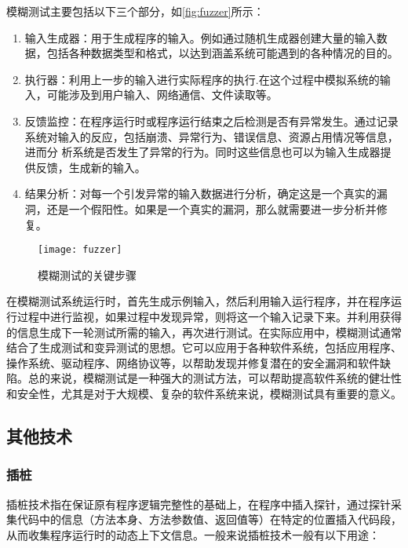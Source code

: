 模糊测试主要包括以下三个部分，如\autoref{fig:fuzzer}所示：

\begin{enumerate}
\item 输入生成器：用于生成程序的输入。例如通过随机生成器创建大量的输入数据，包括各种数据类型和格式，以达到涵盖系统可能遇到的各种情况的目的。
\item 执行器：利用上一步的输入进行实际程序的执行.在这个过程中模拟系统的输入，可能涉及到用户输入、网络通信、文件读取等。
\item 反馈监控：在程序运行时或程序运行结束之后检测是否有异常发生。通过记录系统对输入的反应，包括崩溃、异常行为、错误信息、资源占用情况等信息，进而分 析系统是否发生了异常的行为。同时这些信息也可以为输入生成器提供反馈，生成新的输入。
\item 结果分析：对每一个引发异常的输入数据进行分析，确定这是一个真实的漏洞，还是一个假阳性。如果是一个真实的漏洞，那么就需要进一步分析并修复。
\end{enumerate}

\begin{figure}[ht]
    \centering
    \texttt{[image: fuzzer]}
    \caption{\label{fig:fuzzer}模糊测试的关键步骤\cite{zhu2022fuzzing}}
\end{figure}


在模糊测试系统运行时，首先生成示例输入，然后利用输入运行程序，并在程序运行过程中进行监视，如果过程中发现异常，则将这一个输入记录下来。并利用获得的信息生成下一轮测试所需的输入，再次进行测试。在实际应用中，模糊测试通常结合了生成测试和变异测试的思想。它可以应用于各种软件系统，包括应用程序、操作系统、驱动程序、网络协议等，以帮助发现并修复潜在的安全漏洞和软件缺陷。总的来说，模糊测试是一种强大的测试方法，可以帮助提高软件系统的健壮性和安全性，尤其是对于大规模、复杂的软件系统来说，模糊测试具有重要的意义。

\subsection{其他技术}

\subsubsection{插桩}

插桩技术指在保证原有程序逻辑完整性的基础上，在程序中插入探针，通过探针采集代码中的信息（方法本身、方法参数值、返回值等）在特定的位置插入代码段，从而收集程序运行时的动态上下文信息。一般来说插桩技术一般有以下用途：

